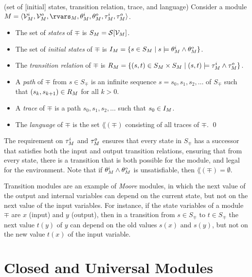 \documentclass[11pt]{report}
\begin{document}
\begin{defi}{(set of [initial] states, transition relation, trace, and language)}
Consider a module $\mp = \tuple{\ivars_\mp, \ovars_\mp, \rvars_\mp,
\iinit_\mp, \oinit_\mp, \itrans_\mp, \otrans_\mp}$.
%
\begin{itemize}

\item
The set of {\em states\/} of $\mp$ is $S_M = {\cal S}[{\cal V}_M]$.

\item
The set of {\em initial states\/} of $\mp$ is
$I_M = \{ s \in S_M \mid s \models \theta^i_M \wedge \theta^o_M \}$.

\item
The {\em transition relation\/} of $\mp$ is
$R_M = \{ (s,t) \in S_M \times S_M \mid
(s,t) \models \tau^i_M \wedge \tau^o_M \}$.

\item
A {\em path\/} of $\mp$ from $s \in S_\mp$ is an infinite sequence
$s=s_0, s_1, s_2, \ldots$ of $S_\mp$ such that
$(s_k,s_{k+1}) \in R_M$ for all $k > 0$.

\item
A {\em trace\/} of $\mp$ is a path $s_0, s_1, s_2, \ldots$
such that $s_0 \in I_M$.

\item
The {\em language\/} of $\mp$ is the set $\lang(\mp)$ consisting of
all traces of $\mp$.
\qed
\end{itemize}
\end{defi}

The requirement on $\tau^i_M$ and $\tau^o_M$ ensures that every
state in $S_\mp$ has a successor that satisfies both the input and
output transition relations, ensuring that from every state, there is
a transition that is both possible for the module, and legal for the
environment.
Note that if $\theta^i_M \wedge \theta^o_M$ is unsatisfiable, then
$\lang(\mp) = \emptyset$.

Transition modules are an example of {\em Moore\/} modules, in which
the next value of the output and internal variables can depend on the
current state, but not on the next value of the input variables.
For instance, if the state variables of a module $\mp$ are $x$
(input) and $y$ (output), then in a transition from
$s \in S_\mp$ to $t \in S_\mp$ the next value $t(y)$ of $y$ can depend
on the old values $s(x)$ and $s(y)$, but not on the new value
$t(x)$ of the input variable.


\section{Closed and Universal Modules}
\end{document}
